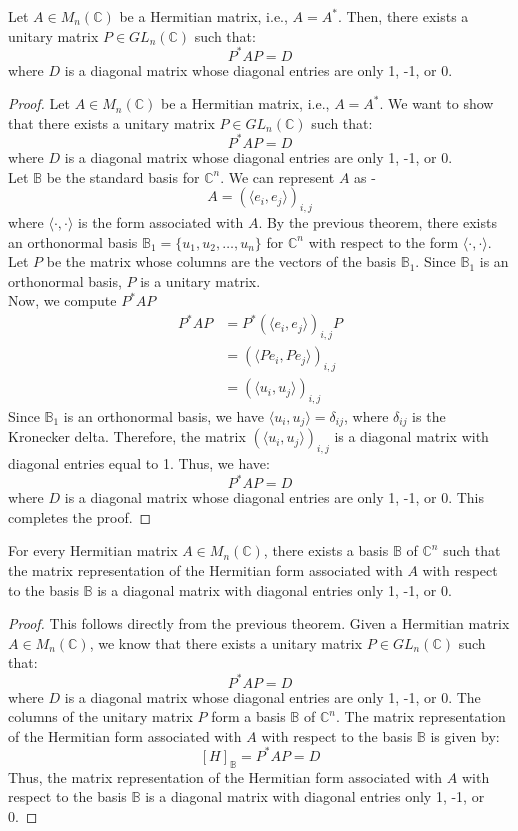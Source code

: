 \documentclass[openany]{book}
\renewcommand{\C}{\mathbb{C}}
\begin{document}
\begin{mytheorem}
Let $A \in M_n(\C)$ be a Hermitian matrix, i.e., $A = A^*$. Then, there exists a unitary matrix $P \in GL_n(\C)$ such that:
$$P^* A P = D$$
where $D$ is a diagonal matrix whose diagonal entries are only 1, -1, or 0.
\end{mytheorem}
\begin{proof}
Let $A \in M_n(\C)$ be a Hermitian matrix, i.e., $A = A^*$. We want to show that there exists a unitary matrix $P \in GL_n(\C)$ such that:
$$P^* A P = D$$
where $D$ is a diagonal matrix whose diagonal entries are only 1, -1, or 0. \\
Let $\mathbb{B}$ be the standard basis for $\C^n$. We can represent $A$ as - 
$$A = (\langle e_i, e_j \rangle)_{i,j}$$
where $\langle \cdot, \cdot \rangle$ is the form associated with $A$. By the previous theorem, there exists an orthonormal basis $\mathbb{B}_1 = \{u_1, u_2, \ldots, u_n\}$ for $\C^n$ with respect to the form $\langle \cdot, \cdot \rangle$. Let $P$ be the matrix whose columns are the vectors of the basis $\mathbb{B}_1$. Since $\mathbb{B}_1$ is an orthonormal basis, $P$ is a unitary matrix. \\
Now, we compute $P^* A P$
\[\begin{aligned}
P^* A P &= P^* (\langle e_i, e_j \rangle)_{i,j} P \\
&= (\langle P e_i, P e_j \rangle)_{i,j} \\
&= (\langle u_i, u_j \rangle)_{i,j}
\end{aligned}\]
Since $\mathbb{B}_1$ is an orthonormal basis, we have $\langle u_i, u_j \rangle = \delta_{ij}$, where $\delta_{ij}$ is the Kronecker delta. Therefore, the matrix $(\langle u_i, u_j \rangle)_{i,j}$ is a diagonal matrix with diagonal entries equal to 1. Thus, we have:
$$P^* A P = D$$
where $D$ is a diagonal matrix whose diagonal entries are only 1, -1, or 0. This completes the proof.
\end{proof}
\begin{corollary}
    For every Hermitian matrix $A \in M_n(\C)$, there exists a basis $\mathbb{B}$ of $\C^n$ such that the matrix representation of the Hermitian form associated with $A$ with respect to the basis $\mathbb{B}$ is a diagonal matrix with diagonal entries only 1, -1, or 0.
\end{corollary}
\begin{proof}
This follows directly from the previous theorem. Given a Hermitian matrix $A \in M_n(\C)$, we know that there exists a unitary matrix $P \in GL_n(\C)$ such that:
$$P^* A P = D$$
where $D$ is a diagonal matrix whose diagonal entries are only 1, -1, or 0. The columns of the unitary matrix $P$ form a basis $\mathbb{B}$ of $\C^n$. The matrix representation of the Hermitian form associated with $A$ with respect to the basis $\mathbb{B}$ is given by:
$$[H]_{\mathbb{B}} = P^* A P = D$$
Thus, the matrix representation of the Hermitian form associated with $A$ with respect to the basis $\mathbb{B}$ is a diagonal matrix with diagonal entries only 1, -1, or 0.
\end{proof}
\end{document}
